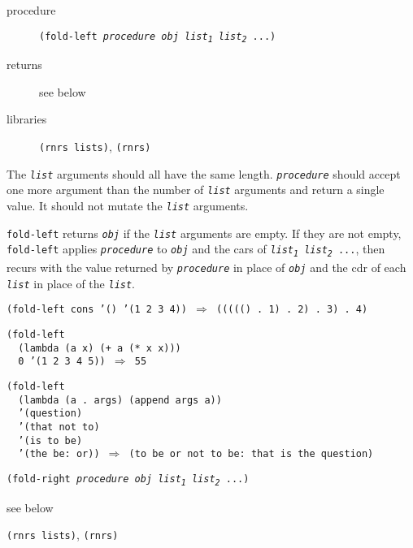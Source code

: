 \begin{description}

\label{control_s38}\item[procedure] \texttt{(fold-left \textit{procedure} \textit{obj} \textit{list\textsubscript{1}} \textit{list\textsubscript{2}} ...)}



\item[returns] see below


\item[libraries] \texttt{(rnrs lists)}, \texttt{(rnrs)}
\end{description}


\label{control_s39}\label{control_s40}The \texttt{\textit{list}} arguments should all have the same length.
\texttt{\textit{procedure}} should accept one more argument than the number of \texttt{\textit{list}}
arguments and return a single value.
It should not mutate the \texttt{\textit{list}} arguments.

\texttt{fold-left} returns \texttt{\textit{obj}} if the \texttt{\textit{list}} arguments are empty.
If they are not empty, \texttt{fold-left} applies \texttt{\textit{procedure}} to
\texttt{\textit{obj}} and the cars of \texttt{\textit{list\textsubscript{1}} \textit{list\textsubscript{2}} ...},
then recurs with
the value returned by \texttt{\textit{procedure}} in place of \texttt{\textit{obj}} and the cdr of
each \texttt{\textit{list}} in place of the \texttt{\textit{list}}.

\begin{alltt}
(fold-left cons '() '(1 2 3 4)) \(\Rightarrow\) ((((() . 1) . 2) . 3) . 4)

(fold-left
  (lambda (a x) (+ a (* x x)))
  0 '(1 2 3 4 5)) \(\Rightarrow\) 55

(fold-left
  (lambda (a . args) (append args a))
  '(question)
  '(that not to)
  '(is to be)
  '(the be: or)) \(\Rightarrow\) (to be or not to be: that is the question)
\end{alltt}

\begin{description}

\label{control_s41}\item[procedure] \texttt{(fold-right \textit{procedure} \textit{obj} \textit{list\textsubscript{1}} \textit{list\textsubscript{2}} ...)}



\item[returns] see below


\item[libraries] \texttt{(rnrs lists)}, \texttt{(rnrs)}
\end{description}


